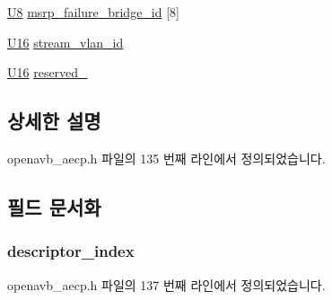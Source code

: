 \begin{DoxyCompactItemize}
\item 
\hyperlink{openavb__types__base__pub_8h_aa63ef7b996d5487ce35a5a66601f3e73}{U8} \hyperlink{structopenavb__aecp__commandresponse__data__set__stream__info__t_af4f515a13b1ab106e94727f481c3a156}{msrp\+\_\+failure\+\_\+bridge\+\_\+id} \mbox{[}8\mbox{]}
\item 
\hyperlink{openavb__types__base__pub_8h_a0a0a322d5fa4a546d293a77ba8b4a71f}{U16} \hyperlink{structopenavb__aecp__commandresponse__data__set__stream__info__t_a31db70d552fc6f5d35875430fca593e6}{stream\+\_\+vlan\+\_\+id}
\item 
\hyperlink{openavb__types__base__pub_8h_a0a0a322d5fa4a546d293a77ba8b4a71f}{U16} \hyperlink{structopenavb__aecp__commandresponse__data__set__stream__info__t_a9886e8bdd009966e2d33176310d1d372}{reserved\+\_}
\end{DoxyCompactItemize}


\subsection{상세한 설명}


openavb\+\_\+aecp.\+h 파일의 135 번째 라인에서 정의되었습니다.



\subsection{필드 문서화}
\subsubsection[{\texorpdfstring{descriptor\+\_\+index}{descriptor_index}}]{ descriptor\+\_\+index}\hypertarget{structopenavb__aecp__commandresponse__data__set__stream__info__t_ab26fb363c24b9a2a4391f9171c981b08}{}\label{structopenavb__aecp__commandresponse__data__set__stream__info__t_ab26fb363c24b9a2a4391f9171c981b08}


openavb\+\_\+aecp.\+h 파일의 137 번째 라인에서 정의되었습니다.

